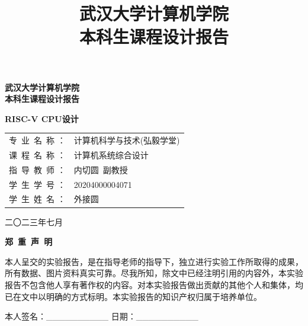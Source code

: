 \documentclass[UTF8,a4paper,autofakebold,15pt]{ctexart}
\title{武汉大学计算机学院\\
	本科生课程设计报告
}
\author{}
\date{}
\begin{document}
	
	\begin{center}
		
	\vspace{50pt}
	{\bf{} 武汉大学计算机学院\\\vspace{10pt}
		本科生课程设计报告}
	
	\vspace{50pt}
	
	{\bf RISC-V CPU设计}
	
	\vspace{100pt}
	
	\begin{spacing}{1.5}
	\qquad\begin{tabular}{ll}
		专\ 业\ 名\ 称   ：&计算机科学与技术(弘毅学堂)\\
		
		课\ 程\ 名\ 称   ：&计算机系统综合设计\\
		
		指\ 导\ 教\ 师   ：&内切圆\ 副教授\\
		
		学\ 生\ 学\ 号   ：&20204000004071\\
		
		学\ 生\ 姓\ 名   ：&外接圆
	\end{tabular}

	\end{spacing}

	\vspace{100pt}

	 二〇二三年七月
	
	\end{center}
	

\newpage

	\begin{center}
	{\bf 郑\ 重\ 声\ 明}
	\end{center}

	\vspace{40pt}
	
	本人呈交的实验报告，是在指导老师的指导下，独立进行实验工作所取得的成果，所有数据、图片资料真实可靠。尽我所知，除文中已经注明引用的内容外，本实验报告不包含他人享有著作权的内容。对本实验报告做出贡献的其他个人和集体，均已在文中以明确的方式标明。本实验报告的知识产权归属于培养单位。
	
	\vspace{40pt}
	
	本人签名：\_\_\_\_\_\_\_\_\_\_  \qquad\qquad\qquad        日期：\_\_\_\_\_\_\_\_\_\_
	
\end{document}
